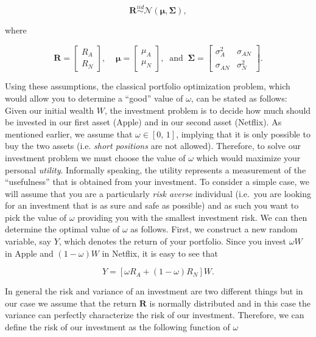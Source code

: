 \documentclass[12pt,]{krantz}
\begin{document}
\[
\mathbf{R} \stackrel{iid}{\sim} \mathcal{N} \left(\boldsymbol{\mu}, \boldsymbol{\Sigma}\right),
\]

where

\[
\mathbf{R} = \left[
\begin{matrix}
 R_A\\
 R_N
\end{matrix} 
\right], \;\;\;\; \boldsymbol{\mu} = \left[
\begin{matrix}
 \mu_A\\
 \mu_N
\end{matrix} 
\right], \;\; \text{and}\;\; \boldsymbol{\Sigma} = \left[
\begin{matrix}
 \sigma_A^2 & \sigma_{AN}\\
 \sigma_{AN} & \sigma_N^2
\end{matrix} 
\right].
\]

Using these assumptions, the classical portfolio optimization problem,
which would allow you to determine a ``good'' value of \(\omega\), can
be stated as follows: Given our initial wealth \(W\), the investment
problem is to decide how much should be invested in our first asset
(Apple) and in our second asset (Netflix). As mentioned earlier, we
assume that \(\omega \in [0,\,1]\), implying that it is only possible to
buy the two assets (i.e. \emph{short positions} are not allowed).
Therefore, to solve our investment problem we must choose the value of
\(\omega\) which would maximize your personal \emph{utility}. Informally
speaking, the utility represents a measurement of the ``usefulness''
that is obtained from your investment. To consider a simple case, we
will assume that you are a particularly \emph{risk averse} individual
(i.e.~you are looking for an investment that is as sure and safe as
possible) and as such you want to pick the value of \(\omega\) providing
you with the smallest investment risk. We can then determine the optimal
value of \(\omega\) as follows. First, we construct a new random
variable, say \(Y\), which denotes the return of your portfolio. Since
you invest \(\omega W\) in Apple and \((1 - \omega) W\) in Netflix, it
is easy to see that

\[Y = \left[\omega R_A + (1 - \omega) R_N \right]W.\]

In general the risk and variance of an investment are two different
things but in our case we assume that the return \(\mathbf{R}\) is
normally distributed and in this case the variance can perfectly
characterize the risk of our investment. Therefore, we can define the
risk of our investment as the following function of \(\omega\)
\end{document}
